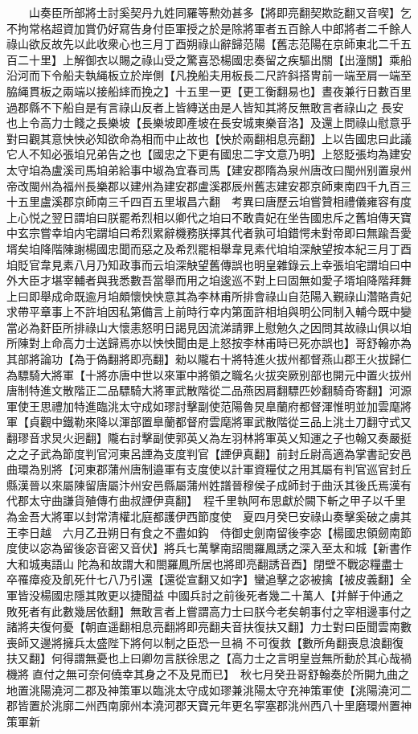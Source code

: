 　　山奏臣所部將士討奚契丹九姓同羅等勲効甚多【將即亮翻契欺訖翻又音喫】乞不拘常格超資加賞仍好寫告身付臣軍授之於是除將軍者五百餘人中郎將者二千餘人祿山欲反故先以此收衆心也三月丁酉朔祿山辭歸范陽【舊志范陽在京師東北二千五百二十里】上解御衣以賜之祿山受之驚喜恐楊國忠奏留之疾驅出關【出潼關】乘船沿河而下令船夫執䋲板立於岸側【凡挽船夫用板長二尺許斜搭冑前一端至肩一端至脇䋲貫板之兩端以接船繂而挽之】十五里一更【更工衡翻易也】晝夜兼行日數百里過郡縣不下船自是有言祿山反者上皆縳送由是人皆知其將反無敢言者祿山之長安也上令高力士餞之長樂坡【長樂坡即產坡在長安城東樂音洛】及還上問祿山慰意乎對曰觀其意怏怏必知欲命為相而中止故也【怏於兩翻相息亮翻】上以告國忠曰此議它人不知必張垍兄弟告之也【國忠之下更有國忠二字文意乃明】上怒貶張均為建安太守垍為盧溪司馬垍弟給事中埱為宜春司馬【建安郡隋為泉州唐改曰閩州别置泉州帝改閩州為福州長樂郡以建州為建安郡盧溪郡辰州舊志建安郡京師東南四千九百三十五里盧溪郡京師南三千四百五里埱昌六翻　考異曰唐歷云垍嘗贊相禮儀雍容有度上心悦之翌日謂垍曰朕罷希烈相以卿代之垍曰不敢貴妃在坐告國忠斥之舊垍傳天寶中玄宗嘗幸垍内宅謂垍曰希烈累辭機務朕擇其代者孰可垍錯愕未對帝即曰無踰吾愛壻矣垍降階陳謝楊國忠聞而惡之及希烈罷相舉韋見素代垍垍深觖望按本紀三月丁酉垍貶官韋見素八月乃知政事而云垍深觖望舊傳誤也明皇雜錄云上幸張垍宅謂垍曰中外大臣才堪宰輔者與我悉數吾當舉而用之垍逡巡不對上曰固無如愛子壻垍降階拜舞上曰即舉成命既逾月垍頗懷怏怏意其為李林甫所排會祿山自范陽入覲祿山濳賂貴妃求帶平章事上不許垍因私第備言上前時行幸内第面許相垍與明公同制入輔今既中變當必為姧臣所排祿山大懷恚怒明日謁見因流涕請罪上慰勉久之因問其故祿山俱以垍所陳對上命高力士送歸焉亦以怏怏聞由是上怒按李林甫時已死亦誤也】哥舒翰亦為其部將論功【為于偽翻將即亮翻】勑以隴右十將特進火拔州都督燕山郡王火拔歸仁為驃騎大將軍【十將亦唐中世以來軍中將領之職名火拔突厥别部也開元中置火拔州唐制特進文散階正二品驃騎大將軍武散階從二品燕因肩翻驃匹妙翻騎奇寄翻】河源軍使王思禮加特進臨洮太守成如璆討擊副使范陽魯炅臯蘭府都督渾惟明並加雲麾將軍【貞觀中鐵勒來降以渾部置臯蘭都督府雲麾將軍武散階從三品上洮土刀翻守式又翻璆音求炅火迥翻】隴右討擊副使郭英乂為左羽林將軍英乂知運之子也翰又奏嚴挺之之子武為節度判官河東呂諲為支度判官【諲伊真翻】前封丘尉高適為掌書記安邑曲環為别將【河東郡蒲州唐制邉軍有支度使以計軍資糧仗之用其屬有判官巡官封丘縣漢晉以來屬陳留唐屬汴州安邑縣屬蒲州姓譜晉穆侯子成師封于曲沃其後氏焉漢有代郡太守曲謙貨殖傳冇曲叔諲伊真翻】　程千里執阿布思獻於闕下斬之甲子以千里為金吾大將軍以封常清權北庭都護伊西節度使　夏四月癸巳安祿山奏擊奚破之虜其王李日越　六月乙丑朔日有食之不盡如鈎　侍御史劍南留後李宓【楊國忠領劒南節度使以宓為留後宓音密又音伏】將兵七萬擊南詔閤羅鳳誘之深入至太和城【新書作大和城夷語山陀為和故謂大和閤羅鳳所居也將即亮翻誘音酉】閉壁不戰宓糧盡士卒罹瘴疫及飢死什七八乃引還【還從宣翻又如字】蠻追擊之宓被擒【被皮義翻】全軍皆没楊國忠隱其敗更以捷聞益中國兵討之前後死者幾二十萬人【并鮮于仲通之敗死者有此數幾居依翻】無敢言者上嘗謂高力士曰朕今老矣朝事付之宰相邊事付之諸將夫復何憂【朝直遥翻相息亮翻將即亮翻夫音扶復扶又翻】力士對曰臣聞雲南數喪師又邊將擁兵太盛陛下將何以制之臣恐一旦禍不可復救【數所角翻喪息浪翻復扶又翻】何得謂無憂也上曰卿勿言朕徐思之【高力士之言明皇豈無所動於其心哉禍機將直付之無可奈何僥幸其身之不及見而已】　秋七月癸丑哥舒翰奏於所開九曲之地置洮陽澆河二郡及神策軍以臨洮太守成如璆兼洮陽太守充神策軍使【洮陽澆河二郡皆置於洮廓二州西南廓州本澆河郡天寶元年更名寜塞郡洮州西八十里磨環州置神策軍新